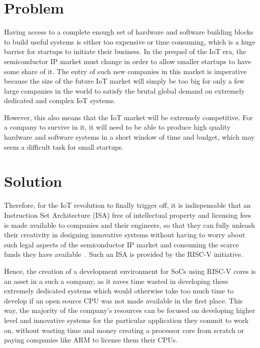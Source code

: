 \section{Problem}
\label{section:problem}

Having access to a complete enough set of hardware and software building blocks
to build useful systems is either too expensive or time consuming, which is a
huge barrier for startups to initiate their business. In the prequel of the IoT
era, the semiconductor IP market must change in order to allow smaller startups
to have some share of it. The entry of such new companies in this market is
imperative because the size of the future IoT market will simply be too big for
only a few large companies in the world to satisfy the brutal global demand on
extremely dedicated and complex IoT systems.

However, this also means that the IoT market will be extremely competitive. For
a company to survive in it, it will need to be able to produce high quality
hardware and software systems in a short window of time and budget, which may
seem a difficult task for small startups.


\section{Solution}
\label{section:solution}

Therefore, for the IoT revolution to finally trigger off, it is indispensable
that an Instruction Set Architecture (ISA) free of intellectual property and
licensing fees is made available to companies and their engineers, so that they
can fully unleash their creativity in designing innovative systems without
having to worry about such legal aspects of the semiconductor IP market and
consuming the scarce funds they have available~\cite{bib:isafree}. Such an ISA
is provided by the RISC-V initiative.

Hence, the creation of a development environment for SoCs using RISC-V cores is
an asset in a such a company, as it saves time wasted in developing these
extremely dedicated systems which would otherwise take too much time to develop
if an open source CPU was not made available in the first place. This way, the
majority of the company's resources can be focused on developing higher level
and innovative systems for the particular application they commit to work on,
without wasting time and money creating a processor core from scratch or paying
companies like ARM to license them their CPUs.

